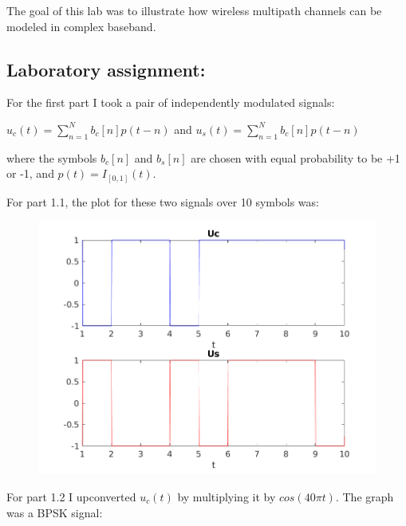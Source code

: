 \documentclass[a4paper,11pt]{article}
\begin{document}
The goal of this lab was to illustrate how wireless multipath channels can be
modeled in complex baseband.

\subsection{Laboratory assignment:}

For the first part I took a pair of independently modulated signals:

\bigskip

$u_c(t)=\sum_{n=1}^{N}b_c[n]p(t-n)$ and $u_s(t)=\sum_{n=1}^{N}b_c[n]p(t-n)$

\bigskip

where the symbols $b_c[n]$ and $b_s[n]$ are chosen with equal probability to be +1
or -1, and $p(t)=I_{[0,1]}(t)$.

\bigskip

For part 1.1, the plot for these two signals over 10 symbols was:

\begin{figure}[!ht]
	\centering
	\includegraphics[scale = 0.6]{images/1_1.png}
\end{figure}

For part 1.2 I upconverted $u_c(t)$ by multiplying it by $cos(40\pi t)$. The
graph was a BPSK signal:
\end{document}
